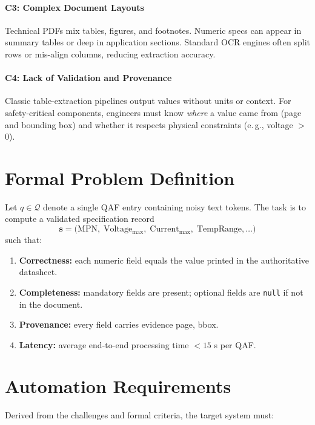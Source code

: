 \paragraph{C3: Complex Document Layouts}  
Technical PDFs mix tables, figures, and footnotes.  
Numeric specs can appear in summary tables or deep in application sections.  
Standard OCR engines often split rows or mis-align columns, reducing extraction accuracy.

\paragraph{C4: Lack of Validation and Provenance}  
Classic table-extraction pipelines output values without units or context.  
For safety-critical components, engineers must know \emph{where} a value came from (page and bounding box) and whether it respects physical constraints (e.\,g., voltage $>$ 0).

\section{Formal Problem Definition}
Let $q \in \mathcal{Q}$ denote a single QAF entry containing noisy text tokens.  
The task is to compute a validated specification record  
\[
\mathbf{s} = \bigl(\mathrm{MPN},\; \mathrm{Voltage_{max}},\; \mathrm{Current_{max}},\; \mathrm{TempRange},\dots\bigr)
\]  
such that:

\begin{enumerate}
  \item \textbf{Correctness:} each numeric field equals the value printed in the authoritative datasheet.
  \item \textbf{Completeness:} mandatory fields are present; optional fields are \texttt{null} if not in the document.  
  \item \textbf{Provenance:} every field carries evidence page, bbox.  
  \item \textbf{Latency:} average end-to-end processing time $<15$ s per QAF.  
\end{enumerate}

\section{Automation Requirements}
Derived from the challenges and formal criteria, the target system must:

